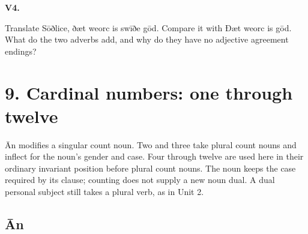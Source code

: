 \par\begin{minipage}{\linewidth}\raggedright
\textbf{V4.}

Translate Sōðlice, ðæt weorc is swīðe gōd. Compare it with Ðæt weorc is gōd. What do the two adverbs add, and why do they have no adjective agreement endings?

\end{minipage}\par\addvspace{4pt}

\section*{9. Cardinal numbers: one through twelve}

Ān modifies a singular count noun. Two and three take plural count nouns and inflect for the noun’s gender and case. Four through twelve are used here in their ordinary invariant position before plural count nouns. The noun keeps the case required by its clause; counting does not supply a new noun dual. A dual personal subject still takes a plural verb, as in Unit 2.

\subsection*{Ān}

